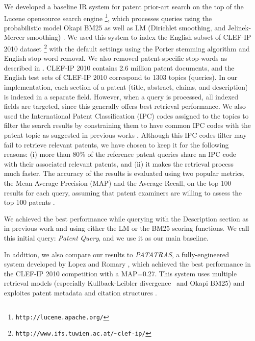 We developed a baseline IR system for patent prior-art search on the top of
the Lucene opensource search engine%
\footnote{\texttt{http://lucene.apache.org/}%
}, which processes queries using the probabilistic
model Okapi BM25 \cite{Robertson1993} as well as LM (Dirichlet
smoothing, and Jelinek-Mercer smoothing) \cite{Zhai2001}. We used
this system to index the English subset of CLEF-IP 2010 dataset%
\footnote{\texttt{http://www.ifs.tuwien.ac.at/\textasciitilde{}clef-ip/}%
} with the default settings using the Porter stemming algorithm \cite{Porter1980} and English stop-word removal. 
We also removed patent-specific stop-words as described in \cite{magdy2012toward}.
CLEF-IP 2010 contains 2.6 million patent documents, and the English
test sets of CLEF-IP 2010 correspond to 1303 topics (queries). In
our implementation, each section of a patent (title, abstract, claims,
and description) is indexed in a separate field. However, when a query
is processed, all indexed fields are targeted, since this generally
offers best retrieval performance. We also used the International
Patent Classification (IPC) codes assigned to the topics to filter
the search results by constraining them to have common IPC codes with
the patent topic as suggested in previous works \cite{lopez2010patatras}.
Although this IPC codes filter may fail to retrieve relevant patents, we
have chosen to keep it for the following reasons: (i) more than 80\%
of the reference patent queries share an IPC code with their associated relevant
patents, and (ii) it makes the retrieval process much faster. The accuracy of the results is evaluated using two popular metrics, the Mean Average Precision (MAP) and the Average Recall, on the top 100 results for each query, assuming that patent examiners are willing to assess the top 100 patents \cite{joho2010survey}. 

We achieved the best performance while querying with the Description
section as in previous work \cite{xue2009transforming} and using
either the LM or the BM25 scoring functions. We call this initial
query: \textit{Patent Query}, and we use it as our main baseline.

In addition, we also compare our results to \textit{PATATRAS}, a fully-engineered system developed by Lopez and Romary \cite{lopez2010patatras}, which achieved the best performance in the CLEF-IP 2010 competition with a MAP=0.27. This system uses multiple retrieval models (especially Kullback-Leibler divergence~\cite{Baeza-Yates2011} and Okapi BM25) and exploites patent metadata and citation structures . %
% 